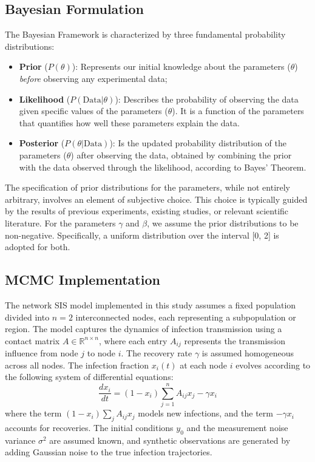 \documentclass[a4paper,10pt]{report}
\begin{document}
\subsection{Bayesian Formulation}
The Bayesian Framework is characterized by three fundamental probability distributions:
\begin{itemize}
    \item \textbf{Prior} ($P(\theta)$): Represents our initial knowledge about the parameters ($\theta$) \emph{before} observing any experimental data;
    \item \textbf{Likelihood} ($P(\text{Data}|\theta)$): Describes the probability of observing the data given specific values of the parameters ($\theta$). It is a function of the parameters that quantifies how well these parameters explain the data.
    \item \textbf{Posterior} ($P(\theta|\text{Data})$): Is the updated probability distribution of the parameters ($\theta$) after observing the data, obtained by combining the prior with the data observed through the likelihood, according to Bayes' Theorem.
\end{itemize}
The specification of prior distributions for the parameters, while not entirely arbitrary, involves an element of subjective choice. This choice is typically guided by the results of previous experiments, existing studies, or relevant scientific literature. For the parameters $\gamma$ and $\beta$, we assume the prior distributions to be non-negative. Specifically, a uniform distribution over the interval [0, 2] is adopted for both.
\subsection{MCMC Implementation}

The network SIS model implemented in this study assumes a fixed population divided into $n = 2$ interconnected nodes, each representing a subpopulation or region. The model captures the dynamics of infection transmission using a contact matrix $A \in \mathbb{R}^{n \times n}$, where each entry $A_{ij}$ represents the transmission influence from node $j$ to node $i$. The recovery rate $\gamma$ is assumed homogeneous across all nodes. The infection fraction $x_i(t)$ at each node $i$ evolves according to the following system of differential equations:
\[
\frac{dx_i}{dt} = (1 - x_i) \sum_{j=1}^{n} A_{ij} x_j - \gamma x_i
\]
where the term $(1 - x_i) \sum_j A_{ij} x_j$ models new infections, and the term $-\gamma x_i$ accounts for recoveries. The initial conditions $y_0$ and the measurement noise variance $\sigma^2$ are assumed known, and synthetic observations are generated by adding Gaussian noise to the true infection trajectories.
\end{document}
